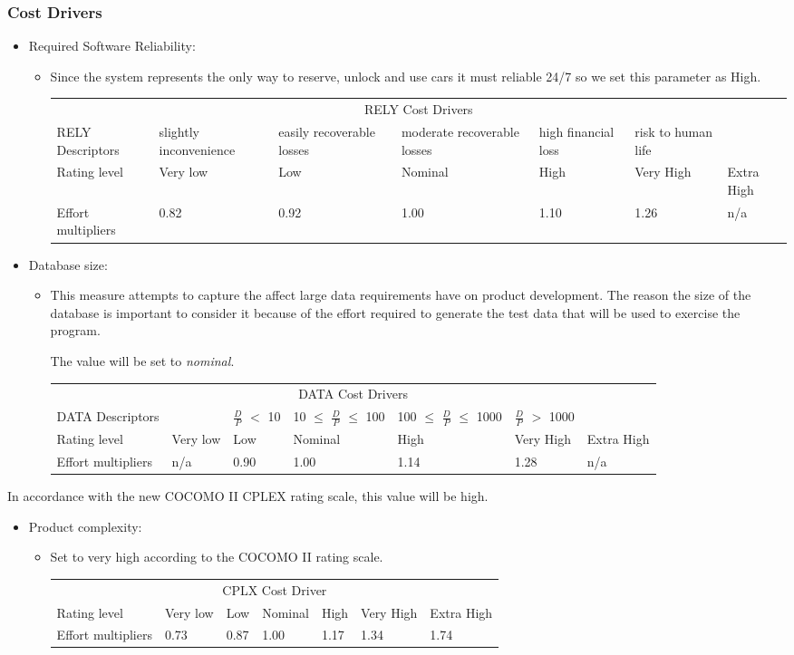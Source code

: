 \documentclass[english]{article}
\newenvironment{costdriverstable}[1]{
	\setlength{\LTleft}{-40pt}
	\begin{longtable}{|p{\dimexpr.16\textwidth}|p{\dimexpr.14\textwidth}|p{\dimexpr.14\textwidth}|p{\dimexpr.14\textwidth}|p{\dimexpr.14\textwidth}|p{\dimexpr.14\textwidth}|p{\dimexpr.14\textwidth}|}
	\hline
	\multicolumn{7}{|c|}{{#1}}\\\hhline{|=======|}
}{
	\hline\end{longtable}
}
\newcommand{\costdescriptors}[7]{
	#1 & #2 & #3 & #4 & #5 & #6 & #7\\
}
\newcommand{\ratinglevel}[6]{
	Rating level & #1 & #2 & #3 & #4 & #5 & #6 \\\hline
}
\newcommand{\effortmultipliers}[6]{
	Effort multipliers & #1 & #2 & #3 & #4 & #5 & #6 \\\hline
}
\begin{document}
\subsubsection{Cost Drivers}
\begin{itemize}
	\item  Required Software Reliability:
	\begin{itemize}
	\item[] Since the system represents the only way to reserve, unlock and use cars it must reliable 24/7 so we set this parameter as High.
	\begin{costdriverstable}{RELY Cost Drivers}
		\costdescriptors{RELY Descriptors}{slightly inconvenience}{easily recoverable losses}{moderate recoverable losses}{high financial loss}{risk to human life}{}\hline
		\ratinglevel{Very low}{Low}{Nominal}{High}{Very High}{Extra High}
		\effortmultipliers{0.82}{0.92}{1.00}{1.10}{1.26}{n/a}
	\end{costdriverstable}
	\end{itemize}
\end{itemize}

\begin{itemize}
	\item Database size:
	\begin{itemize}
	\item[] This measure attempts to capture the affect large data requirements have on product development. The reason the size of the database is important to consider it because of the effort required to generate the test data that will be used to exercise
the program. \par The value will be set to \textit{nominal}.
	\begin{costdriverstable}{DATA Cost Drivers}
		\costdescriptors{DATA Descriptors}{}{$\frac{D}{P}$ $<$ 10}{10 $\le$ $\frac{D}{P}$ $\le$ 100}{100 $\le$ $\frac{D}{P}$ $\le$ 1000}{$\frac{D}{P}$ $>$ 1000}{}\hline
		\ratinglevel{Very low}{Low}{Nominal}{High}{Very High}{Extra High}
		\effortmultipliers{n/a}{0.90}{1.00}{1.14}{1.28}{n/a}
	\end{costdriverstable}
	\end{itemize}
\end{itemize}
In accordance with the new COCOMO II CPLEX rating scale, this value will be high.
\begin{itemize}
	\item Product complexity: 
	\begin{itemize}
	\item[] Set to very high according to the COCOMO II rating scale.
	\begin{costdriverstable}{CPLX Cost Driver}
		\ratinglevel{Very low}{Low}{Nominal}{High}{Very High}{Extra High}
		\effortmultipliers{0.73}{0.87}{1.00}{1.17}{1.34}{1.74}	
	\end{costdriverstable}
	\end{itemize}
\end{itemize}
\end{document}
